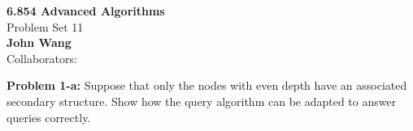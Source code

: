 \documentclass[psamsfonts]{amsart}
\newenvironment{sol}{\vspace{0.25cm}{\large \bfseries Solution:}}{\qedsymbol}
\newenvironment{prob}[1]{\begin{framed}{\large \bfseries Problem #1:}}{\end{framed}}
\newcommand{\makenewtitle}{
    \begin{center}
    {\huge \bfseries 6.854 Advanced Algorithms} \\
    Problem Set 11\\
    \vspace{0.25cm}
    {\bfseries John Wang} \\
    Collaborators:  
    \end{center}
    \vspace{0.5cm}
}
\begin{document}
\makenewtitle

\begin{prob}{1-a}
Suppose that only the nodes with even depth have an associated secondary structure. Show how the query algorithm can be adapted to answer queries correctly.
\end{prob}
\begin{sol}

\end{sol}
\end{document}
